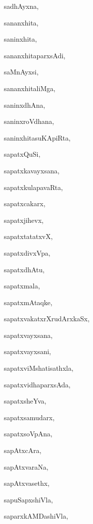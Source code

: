 \begin{multicols}{2}
{sadhAyxna}, \pageref{sadhAyxna}

{sananxhita}, \pageref{sananxhita}

{saninxhita}, \pageref{saninxhita}

{sananxhitaparxsAdi}, \pageref{sananxhitaparxsAdi}

{saMnAyxsi}, \pageref{saMnAyxsi}

{sananxhitaliMga}, \pageref{sananxhitaliMga}

{saninxdhAna}, \pageref{saninxdhAna}

{saninxroVdhana}, \pageref{saninxroVdhana}

{saninxhitasuKApiRta}, \pageref{saninxhitasuKApiRta}

{sapatxQuSi}, \pageref{sapatxQuSi}

{sapatxkavayxsana}, \pageref{sapatxkavayxsana}

{sapatxkulapavaRta}, \pageref{sapatxkulapavaRta}

{sapatxcakarx}, \pageref{sapatxcakarx}

{sapatxjihevx}, \pageref{sapatxjihevx}

{sapatxtatatxvX}, \pageref{sapatxtatatxvX}

{sapatxdivxVpa}, \pageref{sapatxdivxVpa}

{sapatxdhAtu}, \pageref{sapatxdhAtu}

{sapatxmala}, \pageref{sapatxmala}

{sapatxmAtaqke}, \pageref{sapatxmAtaqke1}

{sapatxvakatxrXrudArxkaSx}, \pageref{sapatxvakatxrXrudArxkaSx}

{sapatxvayxsana}, \pageref{sapatxvayxsana}

{sapatxvayxsani}, \pageref{sapatxvayxsani}

{sapatxviMshatisathxla}, \pageref{sapatxviMshatisathxla}

{sapatxvidhaparxsAda}, \pageref{sapatxvidhaparxsAda}

{sapatxsheYva}, \pageref{sapatxsheYva}

{sapatxsamudarx}, \pageref{sapatxsamudarx}

{sapatxsoVpAna}, \pageref{sapatxsoVpAna}

{sapAtxcAra}, \pageref{sapAtxcAra}

{sapAtxvaraNa}, \pageref{sapAtxvaraNa}

{sapAtxvasethx}, \pageref{sapAtxvasethx}

{sapuSapxshiVla}, \pageref{sapuSapxshiVla}

{saparxkAMDashiVla}, \pageref{saparxkAMDashiVla}


\end{multicols}
